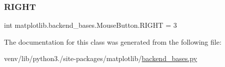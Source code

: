 \subsubsection{\texorpdfstring{R\+I\+G\+HT}{RIGHT}}
{\footnotesize\ttfamily int matplotlib.\+backend\+\_\+bases.\+Mouse\+Button.\+R\+I\+G\+HT = 3\hspace{0.3cm}{\ttfamily [static]}}



The documentation for this class was generated from the following file\+:\begin{DoxyCompactItemize}
\item 
venv/lib/python3./site-\/packages/matplotlib/\hyperlink{backend__bases_8py}{backend\+\_\+bases.\+py}\end{DoxyCompactItemize}
